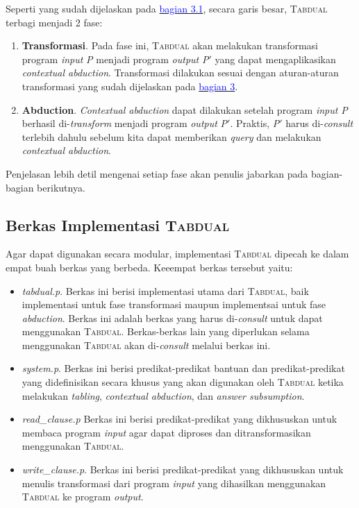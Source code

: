 Seperti yang sudah dijelaskan pada \hyperref[fase]{\textcolor{blue}{bagian 3.1}}, secara garis besar, \textsc{Tabdual} terbagi menjadi 2 fase:

\begin{enumerate}
	\item \textbf{Transformasi}. Pada fase ini, \textsc{Tabdual} akan melakukan transformasi program \textit{input} \textit{P} menjadi program \textit{output} \textit{P$'$} yang dapat mengaplikasikan \textit{contextual abduction}. Transformasi dilakukan sesuai dengan aturan-aturan transformasi yang sudah dijelaskan pada \hyperref[bab3]{\textcolor{blue}{bagian 3}}.
	\item \textbf{Abduction}. \textit{Contextual abduction} dapat dilakukan setelah program \textit{input} \textit{P} berhasil di-\textit{transform} menjadi program \textit{output} \textit{P$'$}. Praktis, \textit{P$'$} harus di-\textit{consult} terlebih dahulu sebelum kita dapat memberikan \textit{query} dan melakukan \textit{contextual abduction}.
\end{enumerate}

Penjelasan lebih detil mengenai setiap fase akan penulis jabarkan pada bagian-bagian berikutnya.

\subsection{Berkas Implementasi \textsc{Tabdual}}
Agar dapat digunakan secara modular, implementasi \textsc{Tabdual} dipecah ke dalam empat buah berkas yang berbeda. Keeempat berkas tersebut yaitu:

\begin{itemize}
	\item \textit{tabdual.p}. Berkas ini berisi implementasi utama dari \textsc{Tabdual}, baik implementasi untuk fase transformasi maupun implementsai untuk fase \textit{abduction}. Berkas ini adalah berkas yang harus di-\textit{consult} untuk dapat menggunakan \textsc{Tabdual}. Berkas-berkas lain yang diperlukan selama menggunakan \textsc{Tabdual} akan di-\textit{consult} melalui berkas ini.
	\item \textit{system.p}. Berkas ini berisi predikat-predikat bantuan dan predikat-predikat yang didefinisikan secara khusus yang akan digunakan  oleh \textsc{Tabdual} ketika melakukan \textit{tabling}, \textit{contextual abduction}, dan \textit{answer subsumption}. 
	\item \textit{read\_clause.p} Berkas ini berisi predikat-predikat yang dikhususkan untuk membaca program \textit{input} agar dapat diproses dan ditransformasikan menggunakan \textsc{Tabdual}.
	\item \textit{write\_clause.p}. Berkas ini berisi predikat-predikat yang dikhususkan untuk menulis transformasi dari program \textit{input} yang dihasilkan menggunakan \textsc{Tabdual} ke program \textit{output}.
\end{itemize}

